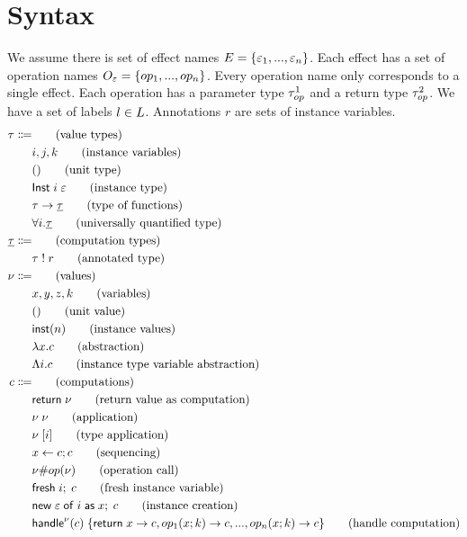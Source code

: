 \section{Syntax}
We assume there is set of effect names $E = \{ \varepsilon_1, ..., \varepsilon_n \}$.
Each effect has a set of operation names $O_\varepsilon = \{ op_1, ..., op_n \}$.
Every operation name only corresponds to a single effect.
Each operation has a parameter type $\tau^1_{op}$ and a return type $\tau^2_{op}$.
We have a set of labels $l \in L$.
Annotations $r$ are sets of instance variables.
\\
\begin{align*}
	\tau \Coloneqq 	& 																	\tag{value types} \\
									& i, j, k														\tag{instance variables} \\
									& ()														\tag{unit type} \\
									& \mathsf{Inst} \; i \; \varepsilon										\tag{instance type} \\
									& \tau \rightarrow \underline{\tau}									\tag{type of functions} \\
									& \forall i . \underline{\tau}									\tag{universally quantified type}\\
	\underline{\tau} \Coloneqq 	& 																	\tag{computation types} \\
									& \tau \; ! \; r											\tag{annotated type} \\
	\nu \Coloneqq	&																		\tag{values} \\
									& x, y, z, k												\tag{variables} \\
									& ()														\tag{unit value} \\
									& \mathsf{inst}(n)													\tag{instance values} \\
									& \lambda x . c										\tag{abstraction} \\
									& \Lambda i . c									\tag{instance type variable abstraction} \\
	c \Coloneqq	&																		\tag{computations} \\
									& \mathsf{return} \; \nu										\tag{return value as computation} \\
									& \nu \; \nu									\tag{application} \\
									& \nu \; [ i ]										\tag{type application} \\
									& x \leftarrow c ; c							\tag{sequencing} \\
									& \nu \# op(\nu)							\tag{operation call} \\
									& \mathsf{fresh} \; i ;\; c									\tag{fresh instance variable} \\
									& \mathsf{new} \; \varepsilon \; \mathsf{of} \; i \; \mathsf{as} \; x ;\; c					\tag{instance creation} \\
									& \mathsf{handle}^{\nu} ( c ) \; \{ \mathsf{return} \; x \rightarrow c, op_1(x ; k) \rightarrow c, ..., op_n(x ; k) \rightarrow c \}						\tag{handle computation} \\
\end{align*}

